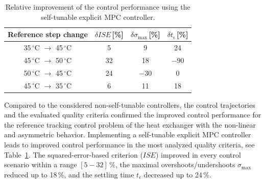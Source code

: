 \documentclass[preprint,12pt]{elsarticle}
\begin{document}
\begin{table}[h!]
	\begin{center}
		\caption{Relative improvement of the control performance using the self-tunable explicit MPC controller.}
		\label{tab:improvement}
		\begin{tabular}{c|c|c|c} 
			Reference step change & $\delta ISE$\,[\%] & $\delta \sigma_{\mathrm{max}}$\,[\%] & $\delta t_{\epsilon}$\,[\%]  \\
			\hline
			35\,$^{\circ}$C $\rightarrow$ 45\,$^{\circ}$C &  5 &  9 & 24 \\ 
			45\,$^{\circ}$C $\rightarrow$ 50\,$^{\circ}$C & 32 & 18 &$-90$  \\ 
			50\,$^{\circ}$C $\rightarrow$ 45\,$^{\circ}$C & 24 &$-30$& 0 \\ 
			45\,$^{\circ}$C $\rightarrow$ 35\,$^{\circ}$C &  6 & 11 & 18   
		\end{tabular}
	\end{center}
\end{table}


Compared to the considered non-self-tunable controllers, the control trajectories and the evaluated quality criteria confirmed the improved control performance for the reference tracking control problem of the heat exchanger with the non-linear and asymmetric behavior. Implementing a self-tunable explicit MPC controller leads to improved control performance in the most analyzed quality criteria, see Table~\ref{tab:improvement}.	 
The squared-error-based criterion ($ISE$) improved in every control scenario within a range $[5-32]$\,\%, the maximal overshoots/undershoots $\sigma_{\mathrm{max}}$ reduced up to 18\,\%, and the settling time $t_{\epsilon}$ decreased up to 24\,\%.  
\end{document}
